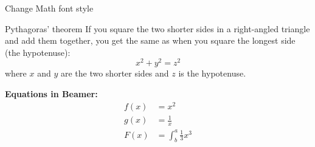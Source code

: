 \documentclass{beamer}
\begin{document}
\begin{frame}{Change Math font style}

\begin{block}{Pythagoras' theorem}
If you square the two shorter sides in a right-angled triangle and add them together, you get the same as when you square the longest side (the hypotenuse):
    \[ x^2 + y^2 = z^2 \]
where $x$ and $y$ are the two shorter sides and $z$ is the hypotenuse.
\end{block}

\textbf{Equations in Beamer: }
\begin{align*}
  f(x) &= x^2\\
  g(x) &= \frac{1}{x}\\
  F(x) &= \int^a_b \frac{1}{3}x^3
\end{align*}

\end{frame}
\end{document}

